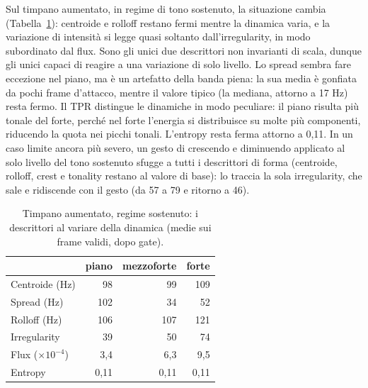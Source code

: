 \documentclass{article}
\begin{document}
Sul timpano aumentato, in regime di tono sostenuto, la situazione cambia (Tabella~\ref{tab:timpano}): centroide e rolloff restano fermi mentre la dinamica varia, e la variazione di intensità si legge quasi soltanto dall'irregularity, in modo subordinato dal flux. Sono gli unici due descrittori non invarianti di scala, dunque gli unici capaci di reagire a una variazione di solo livello. Lo spread sembra fare eccezione nel piano, ma è un artefatto della banda piena: la sua media è gonfiata da pochi frame d'attacco, mentre il valore tipico (la mediana, attorno a 17 Hz) resta fermo. Il TPR distingue le dinamiche in modo peculiare: il piano risulta più tonale del forte, perché nel forte l'energia si distribuisce su molte più componenti, riducendo la quota nei picchi tonali. L'entropy resta ferma attorno a 0,11. In un caso limite ancora più severo, un gesto di crescendo e diminuendo applicato al solo livello del tono sostenuto sfugge a tutti i descrittori di forma (centroide, rolloff, crest e tonality restano al valore di base): lo traccia la sola irregularity, che sale e ridiscende con il gesto (da 57 a 79 e ritorno a 46).

\begin{table}[t]
\centering
\small
\begin{tabular*}{\columnwidth}{@{\extracolsep{\fill}}lrrr@{}}
\toprule
 & piano & mezzoforte & forte \\
\midrule
Centroide (Hz)            & 98  & 99  & 109 \\
Spread (Hz)               & 102 & 34  & 52  \\
Rolloff (Hz)              & 106 & 107 & 121 \\
Irregularity              & 39  & 50  & 74  \\
Flux ($\times 10^{-4}$)   & 3,4 & 6,3 & 9,5 \\
Entropy                   & 0,11 & 0,11 & 0,11 \\
\bottomrule
\end{tabular*}
\caption{Timpano aumentato, regime sostenuto: i descrittori al variare della dinamica (medie sui frame validi, dopo gate).}
\label{tab:timpano}
\end{table}
\end{document}
